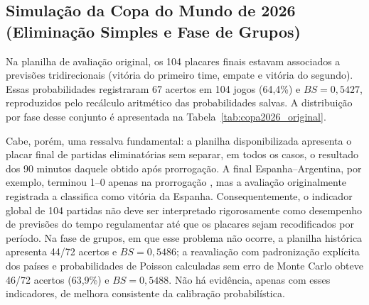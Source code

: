 \documentclass[12pt]{article}
\begin{document}
\subsection{Simulação da Copa do Mundo de 2026 (Eliminação Simples e Fase de Grupos)}

Na planilha de avaliação original, os 104 placares finais estavam associados a previsões tridirecionais (vitória do primeiro time, empate e vitória do segundo). Essas probabilidades registraram 67 acertos em 104 jogos (64,4\%) e $BS=0{,}5427$, reproduzidos pelo recálculo aritmético das probabilidades salvas. A distribuição por fase desse conjunto é apresentada na Tabela~\ref{tab:copa2026_original}.

\begin{table}[ht]
 \centering
 \caption{Desempenho nominal armazenado na planilha original da Copa do Mundo 2026.}
 \label{tab:copa2026_original}
\end{table}

Cabe, porém, uma ressalva fundamental: a planilha disponibilizada apresenta o placar final de partidas eliminatórias sem separar, em todos os casos, o resultado dos 90 minutos daquele obtido após prorrogação. A final Espanha--Argentina, por exemplo, terminou 1--0 apenas na prorrogação \cite{fifa2026final}, mas a avaliação originalmente registrada a classifica como vitória da Espanha. Consequentemente, o indicador global de 104 partidas não deve ser interpretado rigorosamente como desempenho de previsões do tempo regulamentar até que os placares sejam recodificados por período. Na fase de grupos, em que esse problema não ocorre, a planilha histórica apresenta 44/72 acertos e $BS=0{,}5486$; a reavaliação com padronização explícita dos países e probabilidades de Poisson calculadas sem erro de Monte Carlo obteve 46/72 acertos (63,9\%) e $BS=0{,}5488$. Não há evidência, apenas com esses indicadores, de melhora consistente da calibração probabilística.
\end{document}

